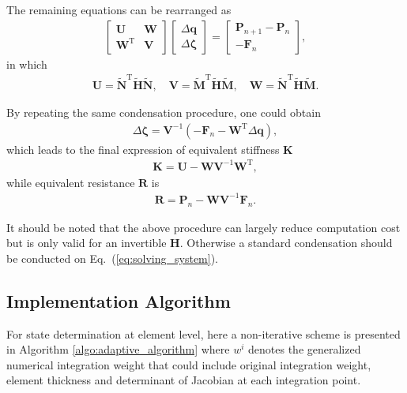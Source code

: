 \documentclass[3p,sort&compress,review,11pt]{elsarticle}
\newcommand*{\mT}{\mathrm{T}}
\newcommand*{\eqsref}[1]{Eq.~(\ref{#1})}
\begin{document}
The remaining equations can be rearranged as
\begin{gather*}
\begin{bmatrix}
\mathbold{U}&\mathbold{W}\\\mathbold{W}^\mT&\mathbold{V}
\end{bmatrix}
\begin{bmatrix}
\Delta\mathbold{q}\\\Delta\mathbold{\zeta}
\end{bmatrix}=
\begin{bmatrix}
\mathbold{P}_{n+1}-\mathbold{P}_n\\-\mathbold{F}_n
\end{bmatrix},
\end{gather*}
in which
\begin{gather}\label{eq:answer_uvw}
\mathbold{U}=\tilde{\mathbold{N}}^\mT\tilde{\mathbold{H}}\tilde{\mathbold{N}},\quad
\mathbold{V}=\tilde{\mathbold{M}}^\mT\tilde{\mathbold{H}}\tilde{\mathbold{M}},\quad
\mathbold{W}=\tilde{\mathbold{N}}^\mT\tilde{\mathbold{H}}\tilde{\mathbold{M}}.
\end{gather}

By repeating the same condensation procedure, one could obtain
\begin{gather}\label{eq:answer_zeta}
\Delta\mathbold{\zeta}=\mathbold{V}^{-1}\left(-\mathbold{F}_n-\mathbold{W}^\mT\Delta\mathbold{q}\right),
\end{gather}
which leads to the final expression of equivalent stiffness $\mathbold{K}$
\begin{gather}\label{eq:answer_stiffness}
\mathbold{K}=\mathbold{U}-\mathbold{W}\mathbold{V}^{-1}\mathbold{W}^\mT,
\end{gather}
while equivalent resistance $\mathbold{R}$ is
\begin{gather}\label{eq:answer_resistance}
\mathbold{R}=\mathbold{P}_n-\mathbold{W}\mathbold{V}^{-1}\mathbold{F}_n.
\end{gather}

It should be noted that the above procedure can largely reduce computation cost but is only valid for an invertible $\mathbold{H}$. Otherwise a standard condensation should be conducted on \eqsref{eq:solving_system}.
\subsection{Implementation Algorithm}
For state determination at element level, here a non-iterative scheme is presented in Algorithm \ref{algo:adaptive_algorithm} where $w^i$ denotes the generalized numerical integration weight that could include original integration weight, element thickness and determinant of Jacobian at each integration point.
\end{document}
